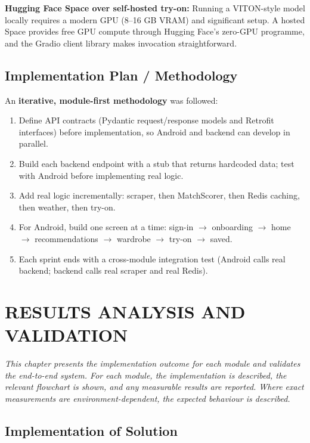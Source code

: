\documentclass[12pt,a4paper]{report}
\begin{document}
\textbf{Hugging Face Space over self-hosted try-on:} Running a VITON-style model locally requires a modern GPU (8--16 GB VRAM) and significant setup. A hosted Space provides free GPU compute through Hugging Face's zero-GPU programme, and the Gradio client library makes invocation straightforward.

\section{Implementation Plan / Methodology}

An \textbf{iterative, module-first methodology} was followed:
\begin{enumerate}
  \item Define API contracts (Pydantic request/response models and Retrofit interfaces) before implementation, so Android and backend can develop in parallel.
  \item Build each backend endpoint with a stub that returns hardcoded data; test with Android before implementing real logic.
  \item Add real logic incrementally: scraper, then MatchScorer, then Redis caching, then weather, then try-on.
  \item For Android, build one screen at a time: sign-in $\to$ onboarding $\to$ home $\to$ recommendations $\to$ wardrobe $\to$ try-on $\to$ saved.
  \item Each sprint ends with a cross-module integration test (Android calls real backend; backend calls real scraper and real Redis).
\end{enumerate}

\chapter{RESULTS ANALYSIS AND VALIDATION}

\textit{This chapter presents the implementation outcome for each module and validates the end-to-end system. For each module, the implementation is described, the relevant flowchart is shown, and any measurable results are reported. Where exact measurements are environment-dependent, the expected behaviour is described.}

\section{Implementation of Solution}
\end{document}
